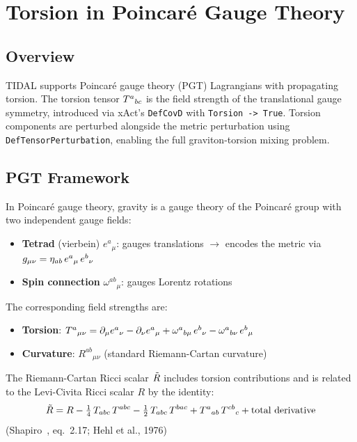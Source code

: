 
\section{Torsion in Poincar\'e Gauge Theory}
\label{sec:torsion}

\subsection{Overview}

TIDAL supports Poincar\'e gauge theory (PGT) Lagrangians with propagating torsion. The torsion tensor $T^a{}_{bc}$ is the field strength of the translational gauge symmetry, introduced via xAct's \texttt{DefCovD} with \texttt{Torsion -> True}. Torsion components are perturbed alongside the metric perturbation using \texttt{DefTensorPerturbation}, enabling the full graviton-torsion mixing problem.

\subsection{PGT Framework}
\label{sec:torsion-pgt}

In Poincar\'e gauge theory, gravity is a gauge theory of the Poincar\'e group with two independent gauge fields:

\begin{itemize}
  \item \textbf{Tetrad} (vierbein) $e^a{}_\mu$: gauges translations $\to$ encodes the metric via $g_{\mu\nu} = \eta_{ab}\, e^a{}_\mu\, e^b{}_\nu$
  \item \textbf{Spin connection} $\omega^{ab}{}_\mu$: gauges Lorentz rotations
\end{itemize}

The corresponding field strengths are:

\begin{itemize}
  \item \textbf{Torsion}: $T^a{}_{\mu\nu} = \partial_\mu e^a{}_\nu - \partial_\nu e^a{}_\mu + \omega^a{}_{b\mu}\, e^b{}_\nu - \omega^a{}_{b\nu}\, e^b{}_\mu$
  \item \textbf{Curvature}: $R^{ab}{}_{\mu\nu}$ (standard Riemann-Cartan curvature)
\end{itemize}

The Riemann-Cartan Ricci scalar $\tilde{R}$ includes torsion contributions and is related to the Levi-Civita Ricci scalar $R$ by the identity:
\begin{equation}
  \tilde{R} = R - \tfrac{1}{4}\, T_{abc}\,T^{abc}
         - \tfrac{1}{2}\, T_{abc}\,T^{bac}
         + T^a{}_{ab}\,T^{cb}{}_{c}
         + \text{total derivative}
  \label{eq:riemann-cartan-identity}
\end{equation}
(Shapiro~\cite{shapiro2002torsion}, eq.~2.17; Hehl et al., 1976)

